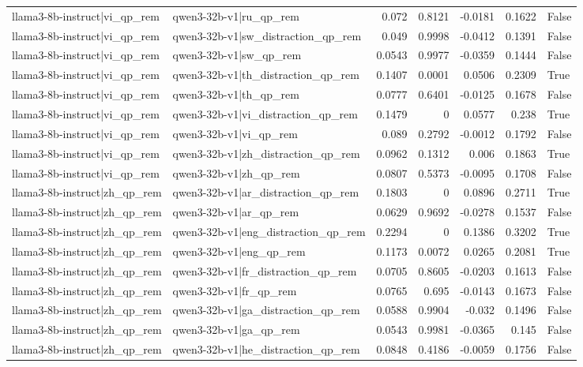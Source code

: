 \begin{table}
\begin{tabular}{l l r r r r l}
llama3-8b-instruct|vi_qp_rem & qwen3-32b-v1|ru_qp_rem & 0.072 & 0.8121 & -0.0181 & 0.1622 & False \\
llama3-8b-instruct|vi_qp_rem & qwen3-32b-v1|sw_distraction_qp_rem & 0.049 & 0.9998 & -0.0412 & 0.1391 & False \\
llama3-8b-instruct|vi_qp_rem & qwen3-32b-v1|sw_qp_rem & 0.0543 & 0.9977 & -0.0359 & 0.1444 & False \\
llama3-8b-instruct|vi_qp_rem & qwen3-32b-v1|th_distraction_qp_rem & 0.1407 & 0.0001 & 0.0506 & 0.2309 & True \\
llama3-8b-instruct|vi_qp_rem & qwen3-32b-v1|th_qp_rem & 0.0777 & 0.6401 & -0.0125 & 0.1678 & False \\
llama3-8b-instruct|vi_qp_rem & qwen3-32b-v1|vi_distraction_qp_rem & 0.1479 & 0 & 0.0577 & 0.238 & True \\
llama3-8b-instruct|vi_qp_rem & qwen3-32b-v1|vi_qp_rem & 0.089 & 0.2792 & -0.0012 & 0.1792 & False \\
llama3-8b-instruct|vi_qp_rem & qwen3-32b-v1|zh_distraction_qp_rem & 0.0962 & 0.1312 & 0.006 & 0.1863 & True \\
llama3-8b-instruct|vi_qp_rem & qwen3-32b-v1|zh_qp_rem & 0.0807 & 0.5373 & -0.0095 & 0.1708 & False \\
llama3-8b-instruct|zh_qp_rem & qwen3-32b-v1|ar_distraction_qp_rem & 0.1803 & 0 & 0.0896 & 0.2711 & True \\
llama3-8b-instruct|zh_qp_rem & qwen3-32b-v1|ar_qp_rem & 0.0629 & 0.9692 & -0.0278 & 0.1537 & False \\
llama3-8b-instruct|zh_qp_rem & qwen3-32b-v1|eng_distraction_qp_rem & 0.2294 & 0 & 0.1386 & 0.3202 & True \\
llama3-8b-instruct|zh_qp_rem & qwen3-32b-v1|eng_qp_rem & 0.1173 & 0.0072 & 0.0265 & 0.2081 & True \\
llama3-8b-instruct|zh_qp_rem & qwen3-32b-v1|fr_distraction_qp_rem & 0.0705 & 0.8605 & -0.0203 & 0.1613 & False \\
llama3-8b-instruct|zh_qp_rem & qwen3-32b-v1|fr_qp_rem & 0.0765 & 0.695 & -0.0143 & 0.1673 & False \\
llama3-8b-instruct|zh_qp_rem & qwen3-32b-v1|ga_distraction_qp_rem & 0.0588 & 0.9904 & -0.032 & 0.1496 & False \\
llama3-8b-instruct|zh_qp_rem & qwen3-32b-v1|ga_qp_rem & 0.0543 & 0.9981 & -0.0365 & 0.145 & False \\
llama3-8b-instruct|zh_qp_rem & qwen3-32b-v1|he_distraction_qp_rem & 0.0848 & 0.4186 & -0.0059 & 0.1756 & False \\

\end{tabular}
\end{table}
